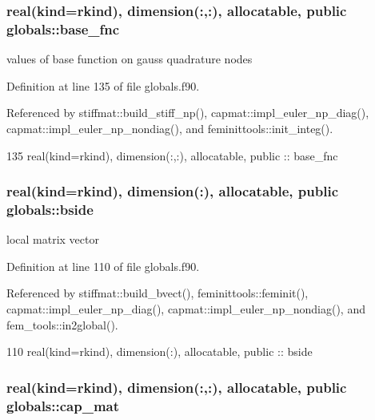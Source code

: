 \subsubsection[{base\+\_\+fnc}]{\setlength{\rightskip}{0pt plus 5cm}real(kind=rkind), dimension(\+:,\+:), allocatable, public globals\+::base\+\_\+fnc}\label{namespaceglobals_a426c66e7799b0f7227ecd856e7c825df}


values of base function on gauss quadrature nodes 



Definition at line 135 of file globals.\+f90.



Referenced by stiffmat\+::build\+\_\+stiff\+\_\+np(), capmat\+::impl\+\_\+euler\+\_\+np\+\_\+diag(), capmat\+::impl\+\_\+euler\+\_\+np\+\_\+nondiag(), and feminittools\+::init\+\_\+integ().


\begin{DoxyCode}
135   \textcolor{keywordtype}{real(kind=rkind)}, \textcolor{keywordtype}{dimension(:,:)}, \textcolor{keywordtype}{allocatable}, \textcolor{keywordtype}{public} :: base_fnc
\end{DoxyCode}
\subsubsection[{bside}]{\setlength{\rightskip}{0pt plus 5cm}real(kind=rkind), dimension(\+:), allocatable, public globals\+::bside}\label{namespaceglobals_a343ddd5ea0dc6a9653f63a2512d68061}


local matrix vector 



Definition at line 110 of file globals.\+f90.



Referenced by stiffmat\+::build\+\_\+bvect(), feminittools\+::feminit(), capmat\+::impl\+\_\+euler\+\_\+np\+\_\+diag(), capmat\+::impl\+\_\+euler\+\_\+np\+\_\+nondiag(), and fem\+\_\+tools\+::in2global().


\begin{DoxyCode}
110   \textcolor{keywordtype}{real(kind=rkind)}, \textcolor{keywordtype}{dimension(:)}, \textcolor{keywordtype}{allocatable}, \textcolor{keywordtype}{public} :: bside 
\end{DoxyCode}
\subsubsection[{cap\+\_\+mat}]{\setlength{\rightskip}{0pt plus 5cm}real(kind=rkind), dimension(\+:,\+:), allocatable, public globals\+::cap\+\_\+mat}\label{namespaceglobals_a97246adf6af4727e372394e0ff93e3c7}


